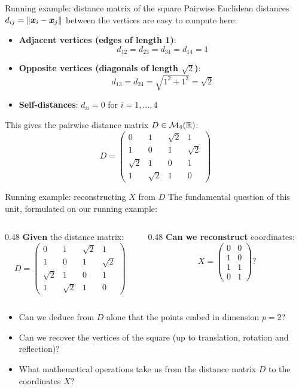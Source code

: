 \documentclass[aspectratio=169]{beamer}\usepackage[]{graphicx}\usepackage[]{xcolor}
\begin{document}
\begin{frame}{Running example: distance matrix of the square}
Pairwise Euclidean distances $d_{ij} = \|\bm{x}_i - \bm{x}_j\|$ between the vertices are easy to compute here:
\vfill
\begin{itemize}
\item \textbf{Adjacent vertices (edges of length 1)}:
\[
d_{12} = d_{23} = d_{34} = d_{14} = 1
\]
\vfill
\item \textbf{Opposite vertices (diagonals of length $\sqrt{2}$)}:
\[
d_{13} = d_{24} = \sqrt{1^2 + 1^2} = \sqrt{2}
\]
\vfill
\item \textbf{Self-distances}: $d_{ii} = 0$ for $i=1,\ldots,4$
\end{itemize}
\vfill
This gives the pairwise distance matrix $D\in\mathcal{M}_4(\mathbb{R})$:
\[
D = \begin{pmatrix}
0 & 1 & \sqrt{2} & 1 \\
1 & 0 & 1 & \sqrt{2} \\
\sqrt{2} & 1 & 0 & 1 \\
1 & \sqrt{2} & 1 & 0
\end{pmatrix}
\]
\end{frame}

\begin{frame}{Running example: reconstructing $X$ from $D$}
The fundamental question of this unit, formulated on our running example:
\vfill
\begin{columns}[c]
\begin{column}{0.48\textwidth}
\textbf{Given} the distance matrix:
\[
D = \begin{pmatrix}
0 & 1 & \sqrt{2} & 1 \\
1 & 0 & 1 & \sqrt{2} \\
\sqrt{2} & 1 & 0 & 1 \\
1 & \sqrt{2} & 1 & 0
\end{pmatrix}
\]
\end{column}
\begin{column}{0.48\textwidth}
\textbf{Can we reconstruct} coordinates:
\[
X = \begin{pmatrix}
0 & 0 \\
1 & 0 \\
1 & 1 \\
0 & 1
\end{pmatrix} ?
\]
\end{column}
\end{columns}
\vfill
\begin{itemize}
\item Can we deduce from $D$ alone that the points embed in dimension $p=2$?
\vfill
\item Can we recover the vertices of the square (up to translation, rotation and reflection)?
\vfill
\item What mathematical operations take us from the distance matrix $D$ to the coordinates $X$?
\end{itemize}
\end{frame}
\end{document}

